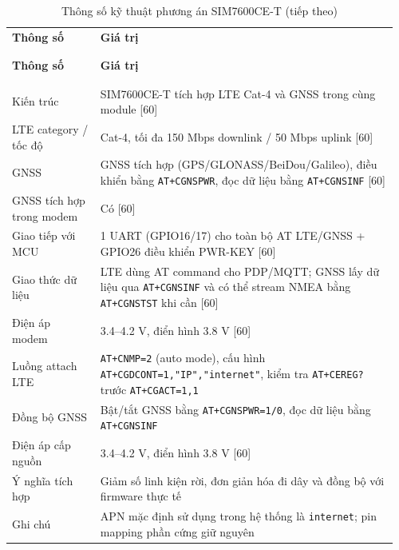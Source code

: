 \documentclass[a4paper]{extarticle}
\newcommand{\thesissettableid}[2]{%
  \renewcommand{\thetable}{#1}%
  \renewcommand{\theHtable}{#2}%
}
\begin{document}
{\thesissettableid{3.4}{tab-ch3-thong-so-ky-thuat-phuong-an-sim7600ce-t}
\def\LTcaptype{table}
\begin{longtable}{|L{0.220\linewidth}|L{0.740\linewidth}|}
\caption{Thông số kỹ thuật phương án SIM7600CE-T}\label{tab:ch3-thong-so-ky-thuat-phuong-an-sim7600ce-t}\\
\hline \textbf{Thông số} & \textbf{Giá trị} \\
\\\hline
\endfirsthead
\caption[]{Thông số kỹ thuật phương án SIM7600CE-T (tiếp theo)}\\
\hline \textbf{Thông số} & \textbf{Giá trị} \\
\\\hline
\endhead
\\\hline
\endfoot
\endlastfoot
Kiến trúc & SIM7600CE-T tích hợp LTE Cat-4 và GNSS trong cùng module
{[}60{]} \\\hline
LTE category / tốc độ & Cat-4, tối đa 150 Mbps downlink / 50 Mbps uplink
{[}60{]} \\\hline
GNSS & GNSS tích hợp (GPS/GLONASS/BeiDou/Galileo), điều khiển bằng
\texttt{AT+CGNSPWR}, đọc dữ liệu bằng \texttt{AT+CGNSINF} {[}60{]} \\\hline
GNSS tích hợp trong modem & Có {[}60{]} \\\hline
Giao tiếp với MCU & 1 UART (GPIO16/17) cho toàn bộ AT LTE/GNSS + GPIO26
điều khiển PWR-KEY {[}60{]} \\\hline
Giao thức dữ liệu & LTE dùng AT command cho PDP/MQTT; GNSS lấy dữ liệu
qua \texttt{AT+CGNSINF} và có thể stream NMEA bằng \texttt{AT+CGNSTST}
khi cần {[}60{]} \\\hline
Điện áp modem & 3.4--4.2 V, điển hình 3.8 V {[}60{]} \\\hline
Luồng attach LTE & \texttt{AT+CNMP=2} (auto mode), cấu hình
\texttt{AT+CGDCONT=1,"IP","internet"}, kiểm tra \texttt{AT+CEREG?} trước
\texttt{AT+CGACT=1,1} \\\hline
Đồng bộ GNSS & Bật/tắt GNSS bằng \texttt{AT+CGNSPWR=1/0}, đọc dữ liệu
bằng \texttt{AT+CGNSINF} \\\hline
Điện áp cấp nguồn & 3.4--4.2 V, điển hình 3.8 V {[}60{]} \\\hline
Ý nghĩa tích hợp & Giảm số linh kiện rời, đơn giản hóa đi dây và đồng bộ
với firmware thực tế \\\hline
Ghi chú & APN mặc định sử dụng trong hệ thống là \texttt{internet}; pin
mapping phần cứng giữ nguyên \\\hline
\end{longtable}
}
\end{document}
